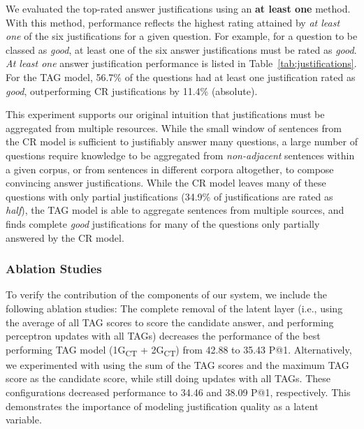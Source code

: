 {\begin{table}[t]
\begin{center}
\end{center}
\end{table}

We evaluated the top-rated answer justifications using an {\bf at least one} method.  With this method, performance reflects the highest rating attained by \emph{at least one} of the six justifications for a given question. For example, for a question to be classed as {\em good}, at least one of the six answer justifications must be rated as {\em good}.  \emph{At least one} answer justification performance is listed in Table~\ref{tab:justifications}. For the TAG model, 56.7\% of the questions had at least one justification rated as {\em good}, outperforming CR justifications by 11.4\% (absolute).  


This experiment supports our original intuition that justifications must be aggregated from multiple resources. While the small window of sentences from the CR model is sufficient to justifiably answer many questions, a large number of questions require knowledge to be aggregated from {\em non-adjacent} sentences within a given corpus, or from sentences in different corpora altogether, to compose convincing answer justifications.  While the CR model leaves many of these questions with only partial justifications (34.9\% of justifications are rated as {\em half}), the TAG model  is able to aggregate sentences from multiple sources, and finds complete {\em good} justifications for many of the questions only partially answered by the CR model.


\subsubsection{Ablation Studies}
\label{sec-cl2017:controls}
To verify the contribution of the components of our system, we include the following ablation studies:
{} The complete removal of the latent layer (i.e., using the average of all TAG scores to score the candidate answer, and performing perceptron updates with all TAGs) decreases the performance of the best performing TAG model (1G\textsubscript{CT} + 2G\textsubscript{CT}) from 42.88 to 35.43 P@1.  Alternatively, we experimented with using the sum of the TAG scores and the maximum TAG score as the candidate score, while still doing updates with all TAGs.  These configurations decreased performance to 34.46 and 38.09 P@1, respectively. This demonstrates the importance of modeling justification quality as a latent variable.

}

